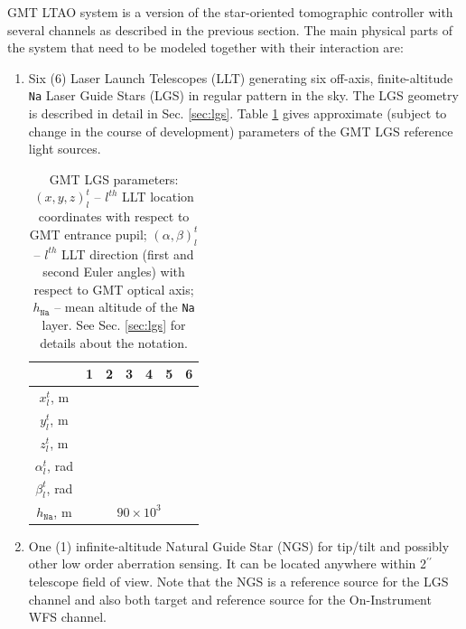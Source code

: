 GMT LTAO system is a version of the star-oriented tomographic controller with
several channels as described in the previous section. The main physical parts
of the system that need to be modeled together with their interaction are:
\begin{enumerate}
  \item Six (6) Laser Launch Telescopes (LLT) generating six off-axis,
  finite-altitude \texttt{Na}
  Laser Guide Stars (LGS) in regular pattern in the sky. The LGS geometry is
  described in detail in Sec. \ref{sec:lgs}. Table \ref{tab:lgs-parameters}
  gives approximate (subject to change in the course of development)
  parameters of the GMT LGS reference light sources.
	\begin{table}[htp]
	\begin{center}
	\begin{tabular}{c|cccccc}
	\hline

	\hline
    & 1 & 2 & 3 & 4 & 5 & 6 \\
	\hline

	\hline
  $x_{l}^{t}$, m &&&&&& \\
  $y_{l}^{t}$, m &&&&&& \\
  $z_{l}^{t}$, m &&&&&& \\
  \hline
  $\alpha_{l}^{t}$, rad &&&&&& \\
  $\beta_{l}^{t}$, rad &&&&&& \\
  \hline
  $h_{\texttt{Na}}$, m & \multicolumn{6}{|c}{$90 \times10^{3}$} \\
	\hline

	\hline
	\end{tabular}
	\end{center}
	\caption{GMT LGS parameters: $(x,y,z)_{l}^{t}$ -- $l^{th}$ LLT location
	coordinates with respect to GMT entrance pupil; $(\alpha,\beta)_{l}^{t}$ --
	$l^{th}$ LLT direction (first and second Euler angles)
	with respect to GMT
	optical axis; $h_{\texttt{Na}}$ -- mean altitude of the \texttt{Na} layer.
	See Sec. \ref{sec:lgs} for details about the notation.}
	\label{tab:lgs-parameters}
	\end{table}

	\item One (1) infinite-altitude Natural Guide Star (NGS) for tip/tilt and
	possibly other low order aberration sensing. It can be located anywhere
	within 2$^{\prime\prime}$ telescope field of view. Note that the NGS is a
	reference source for the LGS channel and also both target and reference
	source for the On-Instrument WFS channel.


\end{enumerate}
